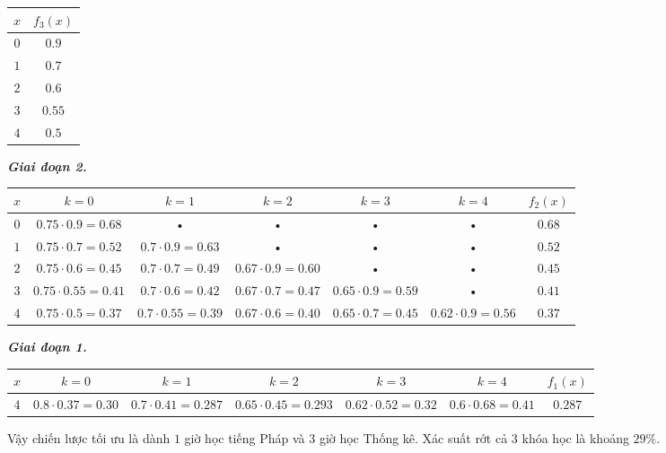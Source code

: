 \documentclass[12pt,a4paper]{article}
\begin{document}
\begin{center}
\begin{table}[H]
\begin{tabular}{|c|c|}
\hline 
\(x\) & \(f_3 \left( x \right)\) \\ 
\hline 
\(0\) & \(0.9\) \\ 
\hline 
\(1\) & \(0.7\) \\ 
\hline 
\(2\) & \(0.6\) \\ 
\hline 
\(3\) & \(0.55\) \\ 
\hline 
\(4\) & \(0.5\) \\ 
\hline 
\end{tabular} 
\end{table}
\end{center}
\textbf{\textit{Giai đoạn 2.}}
\begin{center}
\begin{table}[H]
\begin{tabular}{|c|c|c|c|c|c|c|}
\hline 
\(x\) & \(k = 0\) & \(k = 1\) & \(k = 2\) & \(k = 3\) & \(k = 4\) & \(f_2 \left( x \right)\) \\ 
\hline 
\(0\) & \(0.75 \cdot 0.9 = 0.68\) & • & • & • & • & \(0.68\) \\ 
\hline 
\(1\) & \(0.75 \cdot 0.7 = 0.52\) & \(0.7 \cdot 0.9 = 0.63\) & • & • & • & \(0.52\) \\ 
\hline 
\(2\) & \(0.75 \cdot 0.6 = 0.45\) & \(0.7 \cdot 0.7 = 0.49\) & \(0.67 \cdot 0.9 = 0.60\) & • & • & \(0.45\) \\ 
\hline 
\(3\) & \(0.75 \cdot 0.55 = 0.41\) & \(0.7 \cdot 0.6 = 0.42\) & \(0.67 \cdot 0.7 = 0.47\) & \(0.65 \cdot 0.9 = 0.59\) & • & \(0.41\) \\ 
\hline 
\(4\) & \(0.75 \cdot 0.5 = 0.37\) & \(0.7 \cdot 0.55 = 0.39\) & \(0.67 \cdot 0.6 = 0.40\) & \(0.65 \cdot 0.7 = 0.45\) & \(0.62 \cdot 0.9 = 0.56\) & \(0.37\) \\ 
\hline 
\end{tabular} 
\end{table}
\end{center}
\textbf{\textit{Giai đoạn 1.}}
\begin{center}
\begin{table}[H]
\begin{tabular}{|c|c|c|c|c|c|c|}
\hline 
\(x\) & \(k = 0\) & \(k = 1\) & \(k = 2\) & \(k = 3\) & \(k = 4\) & \(f_1 \left( x \right)\) \\ 
\hline 
\(4\) & \(0.8 \cdot 0.37 = 0.30\) & \(0.7 \cdot 0.41 = 0.287\) & \(0.65 \cdot 0.45 = 0.293\) & \(0.62 \cdot 0.52 = 0.32\) & \(0.6 \cdot 0.68 = 0.41\) & \(0.287\) \\ 
\hline 
\end{tabular} 
\end{table}
\end{center}
Vậy chiến lược tối ưu là dành \(1\) giờ học tiếng Pháp và \(3\) giờ học Thống kê. Xác suất rớt cả \(3\) khóa học là khoảng \(29 \%.\)
\end{document}
